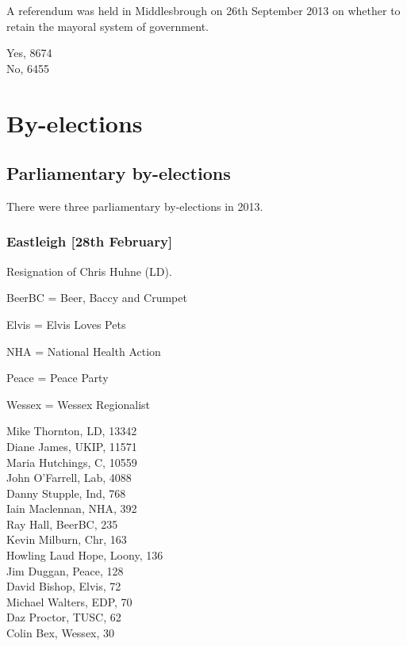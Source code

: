 \documentclass[a4paper,openany,10pt]{book}
\begin{document}
A referendum was held in Middlesbrough on 26th September 2013 on whether to retain the mayoral system of government.



Yes, 8674\\
No, 6455\\


\part{By-elections}

\chapter{Parliamentary by-elections}

There were three parliamentary by-elections in 2013.

\vfill

\section*{Eastleigh\hspace*{\fill}\nolinebreak[1]%
\enspace\hspace*{\fill}
[28th February]}


Resignation of Chris Huhne (LD).

BeerBC = Beer, Baccy and Crumpet

Elvis = Elvis Loves Pets

NHA = National Health Action

Peace = Peace Party

Wessex = Wessex Regionalist



Mike Thornton, LD, 13342\\
Diane James, UKIP, 11571\\
Maria Hutchings, C, 10559\\
John O'Farrell, Lab, 4088\\
Danny Stupple, Ind, 768\\
Iain Maclennan, NHA, 392\\
Ray Hall, BeerBC, 235\\
Kevin Milburn, Chr, 163\\
Howling Laud Hope, Loony, 136\\
Jim Duggan, Peace, 128\\
David Bishop, Elvis, 72\\
Michael Walters, EDP, 70\\
Daz Proctor, TUSC, 62\\
Colin Bex, Wessex, 30\\
\end{document}
